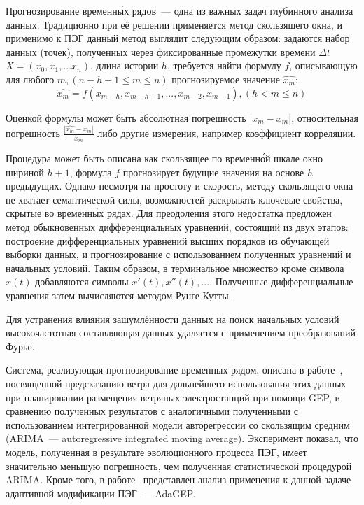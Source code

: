 Прогнозирование временн\'{ы}х рядов~--- одна из важных задач глубинного анализа данных. Традиционно при её решении применяется метод скользящего окна, и применимо к ПЭГ данный метод выглядит следующим образом: задаются набор данных (точек), полученных через фиксированные промежутки времени $\Delta t$ $X = (x_0, x_1, ... x_n)$, длина истории $h$, требуется найти формулу $f$, описывающую для любого $m, (n - h + 1 \leq m \leq n)$ прогнозируемое значение $\hat{x_m}$:
$$
\hat{x_m} = f(x_{m-h}, x_{m-h+1}, ..., x_{m-2}, x_{m-1}), (h < m \leq n)
$$

Оценкой формулы может быть абсолютная погрешность $|\hat{x_m} - x_m|$, относительная погрешность $\frac{|\hat{x_m} - x_m|}{x_m}$ либо другие измерения, например коэффициент корреляции.

Процедура может быть описана как скользящее по временн\'{о}й шкале окно шириной $h + 1$, формула $f$ прогнозирует будущие значения на основе $h$ предыдущих. Однако несмотря на простоту и скорость, методу скользящего окна не хватает семантической силы, возможностей раскрывать ключевые свойства, скрытые во временн\'{ы}х рядах. Для преодоления этого недостатка предложен~\cite{conf/waim/ZuoTLYC04, conf/cilamce/Lopes04} метод обыкновенных дифференциальных уравнений, состоящий из двух этапов: построение дифференциальных уравнений высших порядков из обучающей выборки данных, и прогнозирование с использованием полученных уравнений и начальных условий. Таким образом, в терминальное множество кроме символа $x(t)$ добавляются символы $x'(t), x''(t), ...$. Полученные дифференциальные уравнения затем вычисляются методом Рунге-Кутты.

Для устранения влияния зашумлённости данных на поиск начальных условий высокочастотная составляющая данных удаляется с применением преобразований Фурье.

Система, реализующая прогнозирование временных рядом, описана в работе~\cite{viento}, посвященной предсказанию ветра для дальнейшего использования этих данных при планировании размещения ветряных электростанций при помощи GEP, и сравнению полученных результатов с аналогичными полученными с использованием интегрированной модели авторегрессии со скользящим средним (ARIMA~--- autoregressive integrated moving average). Эксперимент показал, что модель, полученная в результате эволюционного процесса ПЭГ, имеет значительно меньшую погрешность, чем полученная статистической процедурой ARIMA. Кроме того, в работе~\cite{buarbulescu2009time} представлен анализ применения к данной задаче адаптивной модификации ПЭГ~--- AdaGEP.
